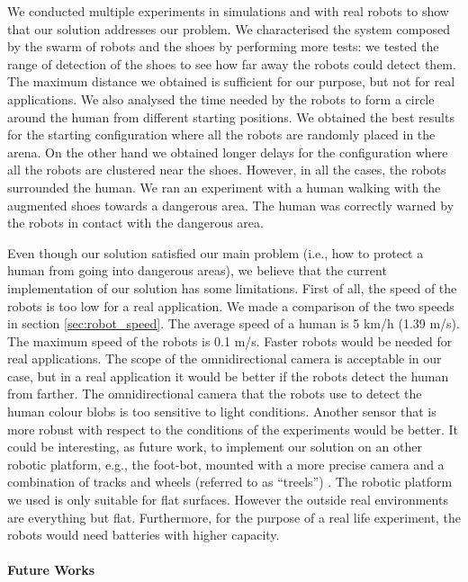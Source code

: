 \documentclass[oneside, a4paper, 12pt]{memoir}
\begin{document}
	We conducted multiple experiments in simulations and with real robots to show that our solution addresses our problem. We characterised the system composed by the swarm of robots and the shoes by performing more tests: we tested the range of detection of the shoes to see how far away the robots could detect them. The maximum distance we obtained is sufficient for our purpose, but not for real applications. We also analysed the time needed by the robots to form a circle around the human from different starting positions. We obtained the best results for the starting configuration where all the robots are randomly placed in the arena. On the other hand we obtained longer delays for the configuration where all the robots are clustered near the shoes. However, in all the cases, the robots surrounded the human. We ran an experiment with a human walking with the augmented shoes towards a dangerous area. The human was correctly warned by the robots in contact with the dangerous area.
	
	Even though our solution satisfied our main problem (i.e., how to protect a human from going into dangerous areas), we believe that the current implementation of our solution has some limitations. First of all, the speed of the robots is too low for a real application. We made a comparison of the two speeds in section \ref{sec:robot_speed}. The average speed of a human is 5 km/h (1.39 m/s). The maximum speed of the robots is 0.1 m/s. Faster robots would be needed for real applications. The scope of the omnidirectional camera is acceptable in our case, but in a real application it would be better if the robots detect the human from farther. The omnidirectional camera that the robots use to detect the human colour blobs is too sensitive to light conditions. Another sensor that is more robust with respect to the conditions of the experiments would be better. It could be interesting, as future work, to implement our solution on an other robotic platform, e.g., the foot-bot, mounted with a more precise camera and a combination of tracks and wheels (referred to as \enquote{treels}) \citep{dorigo2013swarmanoid}. The robotic platform we used is only suitable for flat surfaces. However the outside real environments are everything but flat. Furthermore, for the purpose of a real life experiment, the robots would need batteries with higher capacity.
	
	\paragraph{Future Works}

		
\end{document}
